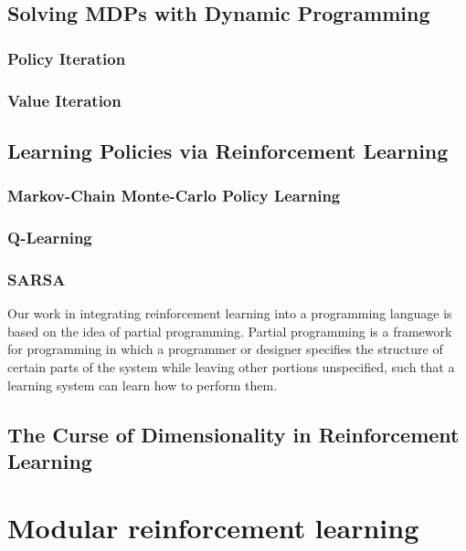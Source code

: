 \subsection{Solving MDPs with Dynamic Programming}

\subsubsection{Policy Iteration}

\subsubsection{Value Iteration}

\subsection{Learning Policies via Reinforcement Learning}

\subsubsection{Markov-Chain Monte-Carlo Policy Learning}

\subsubsection{Q-Learning}

\subsubsection{SARSA}

Our work in integrating reinforcement learning into a programming language is based on the idea of partial programming. Partial programming is a framework for programming in which a programmer or designer specifies the structure of certain parts of the system while leaving other portions unspecified, such that a learning system can learn how to perform them.

\subsection{The Curse of Dimensionality in Reinforcement Learning}


\section{Modular reinforcement learning}

